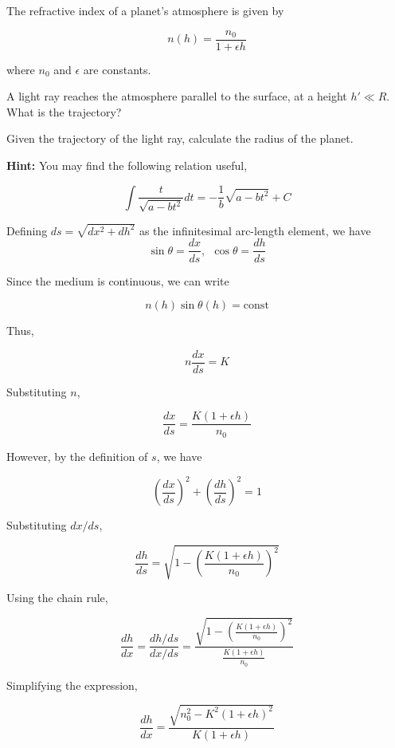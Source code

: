 \documentclass[11pt]{article}
\begin{document}
\begin{pproblem}
    The refractive index of a planet's atmosphere is given by

    \[n(h) = \frac{n_0}{1+\epsilon h}\]

    where \(n_0\) and \(\epsilon\) are constants.

    \begin{alternativas}
        \item A light ray reaches the atmosphere parallel to the surface, at a height \(h'\ll R\). What is the trajectory?
        \item Given the trajectory of the light ray, calculate the radius of the planet.
    
        \textbf{Hint:} You may find the following relation useful,

        \[\int \frac{t}{\sqrt{a-bt^2}}dt = -\frac{1}{b}\sqrt{a-bt^2}+C\]
    \end{alternativas}
\begin{pssolution*}{}{}
    \begin{alternativas}
        \item Defining \(ds = \sqrt{dx^2+dh^2}\) as the infinitesimal arc-length element, we have
        \[\sin\theta = \frac{dx}{ds}, \ \ \cos\theta = \frac{dh}{ds}\]

        Since the medium is continuous, we can write

        \[n(h)\sin\theta(h)=\mathrm{const}\]

        Thus,

        \[n\frac{dx}{ds} = K\]

        Substituting \(n\),

        \[\frac{dx}{ds} = \frac{K(1+\epsilon h)}{n_0}\]

        However, by the definition of \(s\), we have

        \[\left(\frac{dx}{ds}\right)^2 + \left(\frac{dh}{ds}\right)^2 = 1\]

        Substituting \(dx/ds\),

        \[\frac{dh}{ds} = \sqrt{1- \left(\frac{K(1+\epsilon h)}{n_0}\right)^2}\]

        Using the chain rule,

        \[\frac{dh}{dx} = \frac{dh/ds}{dx/ds} = \frac{\sqrt{1- \left(\frac{K(1+\epsilon h)}{n_0}\right)^2}}{\frac{K(1+\epsilon h)}{n_0}}\]

        Simplifying the expression,

        \[\frac{dh}{dx} = \frac{\sqrt{n_0^2 - K^2(1+\epsilon h)^2}}{K(1+\epsilon h)}\]


\end{alternativas}
\end{pssolution*}
\end{pproblem}
\end{document}
